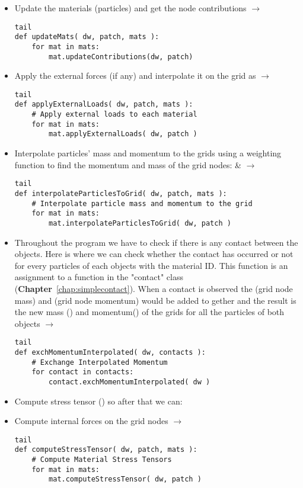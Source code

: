 \documentclass[11pt,fleqn]{book} %
\begin{document}
\begin{itemize}
\item Update the materials (particles) and get the node contributions $\rightarrow$ 
\begin{lstlisting}tail
def updateMats( dw, patch, mats ):
    for mat in mats:
        mat.updateContributions(dw, patch)
\end{lstlisting}
\item Apply the external forces (if any) and interpolate it on the grid as  $\rightarrow$ 
\begin{lstlisting}tail
def applyExternalLoads( dw, patch, mats ):
    # Apply external loads to each material
    for mat in mats:
        mat.applyExternalLoads( dw, patch )
\end{lstlisting}
\item Interpolate particles' mass and momentum to the grids using a weighting function to find the momentum and mass of the grid nodes:  \&  $\rightarrow$ 
\begin{lstlisting}tail
def interpolateParticlesToGrid( dw, patch, mats ):
    # Interpolate particle mass and momentum to the grid
    for mat in mats:
        mat.interpolateParticlesToGrid( dw, patch ) 
\end{lstlisting}
\item Throughout the program we have to check if there is any contact between the objects. Here is where we can check whether the contact has occurred or not for every particles of each objects with the material ID. This function is an assignment to a function in the "contact" class (\textbf{Chapter}~\ref{chap:simplecontact}). When a contact is observed the  (grid node mass) and  (grid node momentum) would be added to gether and the result is the new mass () and momentum() of the grids for all the particles of both objects $\rightarrow$ 
\begin{lstlisting}tail
def exchMomentumInterpolated( dw, contacts ):
    # Exchange Interpolated Momentum
    for contact in contacts:
        contact.exchMomentumInterpolated( dw )
\end{lstlisting}
\item Compute stress tensor () so after that we can:
\item Compute internal forces on the grid nodes $\rightarrow$ 
\begin{lstlisting}tail
def computeStressTensor( dw, patch, mats ):
    # Compute Material Stress Tensors
    for mat in mats:
        mat.computeStressTensor( dw, patch )


\end{lstlisting}
\end{itemize}
\end{document}
